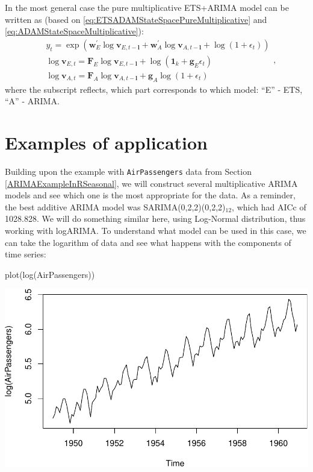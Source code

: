 \documentclass[
]{book}
\newenvironment{Shaded}{\begin{snugshade}}{\end{snugshade}}
\newcommand{\FunctionTok}[1]{\textcolor[rgb]{0.00,0.00,0.00}{#1}}
\newcommand{\NormalTok}[1]{#1}
\theoremstyle{definition}
\theoremstyle{definition}
\theoremstyle{definition}
\theoremstyle{definition}
\theoremstyle{remark}
\begin{document}
In the most general case the pure multiplicative ETS+ARIMA model can be written as (based on \eqref{eq:ETSADAMStateSpacePureMultiplicative} and \eqref{eq:ADAMStateSpaceMultiplicative}):
\begin{equation}
  \begin{aligned}
    &{y}_{t} = \exp \left( \mathbf{w}_{E}^\prime \log \mathbf{v}_{E,t-\mathbf{l}} + \mathbf{w}_{A}^\prime \log \mathbf{v}_{A,t-\mathbf{l}} + \log(1+\epsilon_t) \right) \\
        &\log \mathbf{v}_{E,t} = \mathbf{F}_{E} \log \mathbf{v}_{E,t-\mathbf{l}} + \log(\mathbf{1}_k + \mathbf{g}_E \epsilon_t) \\
    &\log \mathbf{v}_{A,t} = \mathbf{F}_{A} \log \mathbf{v}_{A,t-\mathbf{l}} + \mathbf{g}_A \log(1+\epsilon_t)
  \end{aligned} ,
  \label{eq:ADAMETSARIMA}
\end{equation}
where the subscript reflects, which part corresponds to which model: ``E'' - ETS, ``A'' - ARIMA.

\hypertarget{ADAMARIMAExamples}{%
\section{Examples of application}\label{ADAMARIMAExamples}}

Building upon the example with \texttt{AirPassengers} data from Section \ref{ARIMAExampleInRSeasonal}, we will construct several multiplicative ARIMA models and see which one is the most appropriate for the data. As a reminder, the best additive ARIMA model was SARIMA(0,2,2)(0,2,2)\(_{12}\), which had AICc of 1028.828. We will do something similar here, using Log-Normal distribution, thus working with logARIMA. To understand what model can be used in this case, we can take the logarithm of data and see what happens with the components of time series:

\begin{Shaded}
\begin{Highlighting}[]
\FunctionTok{plot}\NormalTok{(}\FunctionTok{log}\NormalTok{(AirPassengers))}
\end{Highlighting}
\end{Shaded}

\includegraphics{Svetunkov--2022----ADAM_files/figure-latex/unnamed-chunk-49-1.pdf}
\end{document}
